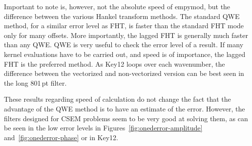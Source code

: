 \documentclass[manuscript]{geophysics}
\newcommand{\tnt}[1]{#1}
\newcommand{\empymod}{\tnt{empymod}\xspace}
\begin{document}
%
Important to note is, however, not the absolute speed of \empymod, but the
difference between the various Hankel transform methods. The standard QWE
method, for a similar error level as FHT, is faster than the standard FHT mode
only for many offsets. More importantly, the lagged FHT is generally much
faster than any QWE. QWE is very useful to check the error level of a result.
If many kernel evaluations have to be carried out, and speed is of importance,
the lagged FHT is the preferred method. As Key12 loops over each wavenumber,
the difference between the vectorized and non-vectorized version can be best
seen in the long 801\,pt filter.

These results regarding speed of calculation do not change the fact that the
advantage of the QWE method is to have an estimate of the error. However, the
filters designed for CSEM problems seem to be very good at solving them, as can
be seen in the low error levels in Figures~\ref{fig:onederror-amplitude}
and~\ref{fig:onederror-phase} or in Key12.
\end{document}
